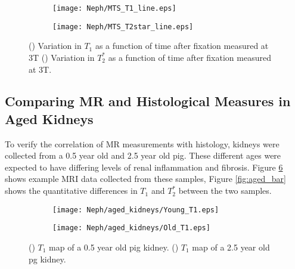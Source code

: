 \begin{figure}[H]
	\centering
	\begin{subfigure}[c]{0.47\textwidth}
		\centering
		\texttt{[image: Neph/MTS\_T1\_line.eps]}
		\caption{}
		\label{fig:fixation_t1_3t_mts}
	\end{subfigure}
	\hfill
	\begin{subfigure}[c]{0.47\textwidth}
		\centering
		\texttt{[image: Neph/MTS\_T2star\_line.eps]}
		\caption{}
		\label{fig:fixation_t2star_3t_mts}
	\end{subfigure}
	\caption{() Variation in $T_1$ as a function of time after fixation measured at 3T () Variation in $T_2^*$ as a function of time after fixation measured at 3T.}
	\label{fig:fixation_mts}
\end{figure}

\subsection{Comparing MR and Histological Measures in Aged Kidneys}

To verify the correlation of MR measurements with histology, kidneys were collected from a 0.5 year old and 2.5 year old pig. These different ages were expected to have differing levels of renal inflammation and fibrosis. Figure \ref{fig:aged_map} shows example \ac{MRI} data collected from these samples, Figure \ref{fig:aged_bar} shows the quantitative differences in $T_1$ and $T_2^*$ between the two samples.

\begin{figure}[H]
	\centering
	\begin{subfigure}[c]{0.47\textwidth}
		\centering
		\texttt{[image: Neph/aged\_kidneys/Young\_T1.eps]}
		\caption{}
		\label{fig:neph_aged_t1_map}
	\end{subfigure}
	\hfill
	\begin{subfigure}[c]{0.47\textwidth}
		\centering
		\texttt{[image: Neph/aged\_kidneys/Old\_T1.eps]}
		\caption{}
		\label{fig:neph_aged_t2star_map}
	\end{subfigure}
	\caption{() $T_1$ map of a 0.5 year old pig kidney. () $T_1$ map of a 2.5 year old pg kidney.}
	\label{fig:aged_map}
\end{figure}

